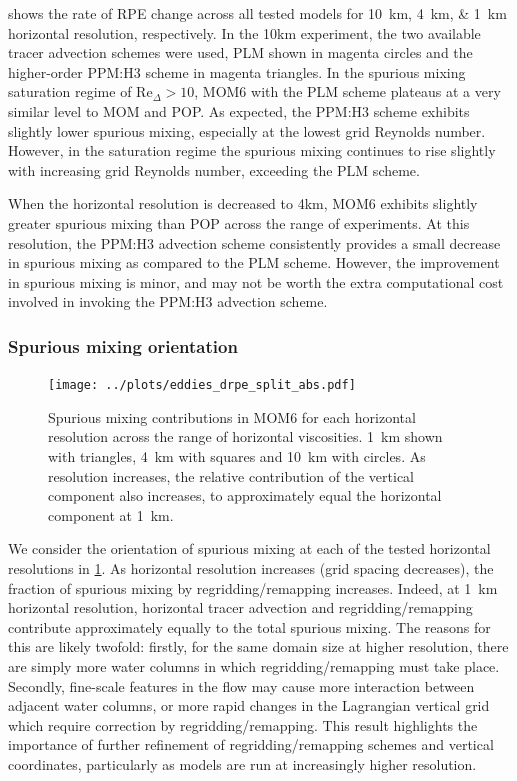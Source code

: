  shows the rate of RPE change across all tested models for \SIlist{10;4;1}{\kilo\metre} horizontal resolution, respectively. In the 10km experiment, the two available tracer advection schemes were used, PLM shown in magenta circles and the higher-order PPM:H3 scheme in magenta triangles. In the spurious mixing saturation regime of $\mathrm{Re}_\Delta > 10$, MOM6 with the PLM scheme plateaus at a very similar level to MOM and POP. As expected, the PPM:H3 scheme exhibits slightly lower spurious mixing, especially at the lowest grid Reynolds number. However, in the saturation regime the spurious mixing continues to rise slightly with increasing grid Reynolds number, exceeding the PLM scheme.

When the horizontal resolution is decreased to 4km, MOM6 exhibits slightly greater spurious mixing than POP across the range of experiments. At this resolution, the PPM:H3 advection scheme consistently provides a small decrease in spurious mixing as compared to the PLM scheme. However, the improvement in spurious mixing is minor, and may not be worth the extra computational cost involved in invoking the PPM:H3 advection scheme.

\subsubsection{Spurious mixing orientation}

\begin{figure}
  \texttt{[image: ../plots/eddies\_drpe\_split\_abs.pdf]}
  \caption{\label{fig:eddies-drpesplit} Spurious mixing contributions in MOM6 for each horizontal resolution across the range of horizontal viscosities. \SI{1}{\kilo\metre} shown with triangles, \SI{4}{\kilo\metre} with squares and \SI{10}{\kilo\metre} with circles. As resolution increases, the relative contribution of the vertical component also increases, to approximately equal the horizontal component at \SI{1}{\kilo\metre}.}
\end{figure}

We consider the orientation of spurious mixing at each of the tested horizontal resolutions in \cref{fig:eddies-drpesplit}. As horizontal resolution increases (grid spacing decreases), the fraction of spurious mixing by regridding/remapping increases. Indeed, at \SI{1}{\kilo\metre} horizontal resolution, horizontal tracer advection and regridding/remapping contribute approximately equally to the total spurious mixing. The reasons for this are likely twofold: firstly, for the same domain size at higher resolution, there are simply more water columns in which regridding/remapping must take place. Secondly, fine-scale features in the flow may cause more interaction between adjacent water columns, or more rapid changes in the Lagrangian vertical grid which require correction by regridding/remapping. This result highlights the importance of further refinement of regridding/remapping schemes and vertical coordinates, particularly as models are run at increasingly higher resolution.
